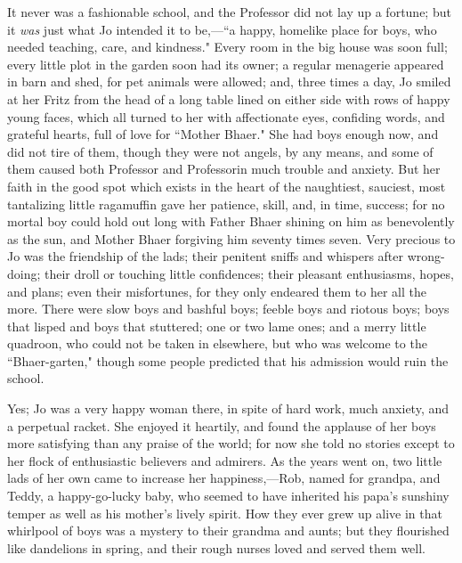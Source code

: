 It never was a fashionable school, and the Professor did not lay up a
fortune; but it \emph{was} just what Jo intended it to be,---``a happy,
homelike place for boys, who needed teaching, care, and kindness." Every
room in the big house was soon full; every little plot in the garden
soon had its owner; a regular menagerie appeared in barn and shed, for
pet animals were allowed; and, three times a day, Jo smiled at her Fritz
from the head of a long table lined on either side with rows of happy
young faces, which all turned to her with affectionate eyes, confiding
words, and grateful hearts, full of love for ``Mother Bhaer." She had
boys enough now, and did not tire of them, though they were not angels,
by any means, and some of them caused both Professor and Professorin
much trouble and anxiety. But her faith in the good spot which exists in
the heart of the naughtiest, sauciest, most tantalizing little
ragamuffin gave her patience, skill, and, in time, success; for no
mortal boy could hold out long with Father Bhaer shining on him as
benevolently as the sun, and Mother Bhaer forgiving him seventy times
seven. Very precious to Jo was the friendship of the lads; their
penitent sniffs and whispers after wrong-doing; their droll or touching
little confidences; their pleasant enthusiasms, hopes, and plans; even
their misfortunes, for they only endeared them to her all the more.
There were slow boys and bashful boys; feeble boys and riotous boys;
boys that lisped and boys that stuttered; one or two lame ones; and a
merry little quadroon, who could not be taken in elsewhere, but who was
welcome to the ``Bhaer-garten," though some people predicted that his
admission would ruin the school.

Yes; Jo was a very happy woman there, in spite of hard work, much
anxiety, and a perpetual racket. She enjoyed it heartily, and found the
applause of her boys more satisfying than any praise of the world; for
now she told no stories except to her flock of enthusiastic believers
and admirers. As the years went on, two little lads of her own came to
increase her happiness,---Rob, named for grandpa, and Teddy, a
happy-go-lucky baby, who seemed to have inherited his
papa's sunshiny temper as well as his
mother's lively spirit. How they ever grew up alive in
that whirlpool of boys was a mystery to their grandma and aunts; but
they flourished like dandelions in spring, and their rough nurses loved
and served them well.

